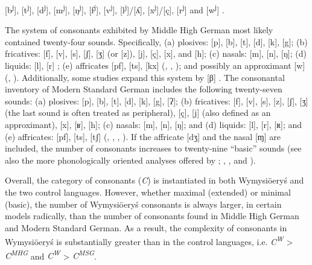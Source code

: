 \documentclass[output=paper,hidelinks]{langscibook}
\begin{document}
[b\textsuperscript{j}], [t\textsuperscript{j}], [d\textsuperscript{j}], [m\textsuperscript{j}], [ŋ\textsuperscript{j}], [f\textsuperscript{j}], [v\textsuperscript{j}], [l\textsuperscript{j}]/[ʎ], [x\textsuperscript{j}]/[ç], [r\textsuperscript{j}] and [w\textsuperscript{j}] \citep{Andrason2021}.

The system of consonants exhibited by Middle High German most likely contained twenty-four sounds. Specifically, (a) plosives: [p], [b], [t], [d], [k], [g]; (b) fricatives: [f], [v], [s], [ʃ], [ʒ] (or [z]), [j], [ç], [x], and [h]; (c) nasals: [m], [n], [ŋ]; (d) liquids: [l], [r] \citep[141, 169--171]{paul_mittelhochdeutsche_2007}; (e) affricates [pf], [ts], [kx] (\citealt[18--19]{de_boor_mittelhochdeutsche_1973}, \citealt[1135]{simmler_phonetik_1985}, \citealt[141]{paul_mittelhochdeutsche_2007}); and possibly an approximant [w] (\citealt[24]{wright_middle_1917}, \citealt[1135]{simmler_phonetik_1985}). Additionally, some studies expand this system by [β] \citep[18]{de_boor_mittelhochdeutsche_1973}. The consonantal inventory of Modern Standard German includes the following twenty-seven sounds: (a) plosives: [p], [b], [t], [d], [k], [g], [ʔ]; (b) fricatives: [f], [v], [s], [z], [ʃ], [ʒ] (the last sound is often treated as peripheral), [ç], [j] (also defined as an approximant), [x], [ʁ], [h]; (c) nasals: [m], [n], [ŋ]; and (d) liquids: [l], [r], [ʀ]; and (e) affricates: [pf], [ts], [tʃ] (\citealt[353--355]{eisenberg_german_1994}, \citealt[92, 99--101, 104]{johnson_exploring_2008}, \citealt[10--14]{fagan_german_2009}, \citealt[13--16]{obrein_german_2016}). If the affricate [dʒ] \citep[16]{obrein_german_2016} and the nasal [ɱ] \citep{hall_phonologie_2000} are included, the number of consonants increases to twenty-nine ``basic'' sounds (see also the more phonologically oriented analyses offered by \citealt[112--115, 121--122]{russ_german_1994}; \citealt[22--26]{wiese_phonology_1996}, \citealt[31]{hall_phonologie_2000}, and \citealt[35--37]{fox_structure_2005}).

Overall, the category of consonants (\textit{C}) is instantiated in both Wymysiöeryś and the two control languages. However, whether maximal (extended) or minimal (basic), the number of Wymysiöeryś consonants is always larger, in certain models radically, than the number of consonants found in Middle High German and Modern Standard German. As a result, the complexity of consonants in Wymysiöeryś is substantially greater than in the control languages, i.e. \textit{C\textsuperscript{W}} > \textit{C\textsuperscript{MHG}} and \textit{C\textsuperscript{W}} > \textit{C\textsuperscript{MSG}}.
\end{document}
